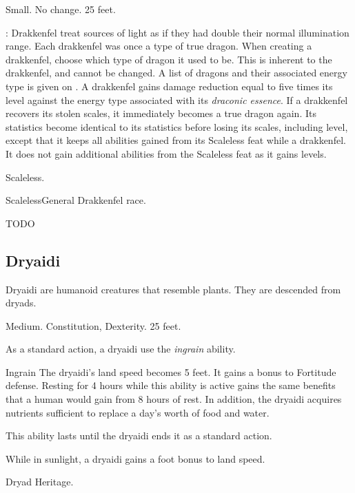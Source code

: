          Small.
         No change.
         25 feet.
        \begin{itemize}
            : Drakkenfel treat sources of light as if they had double their normal illumination range.
             Each drakkenfel was once a type of true dragon.
                When creating a drakkenfel, choose which type of dragon it used to be.
                This is inherent to the drakkenfel, and cannot be changed.
                A list of dragons and their associated energy type is given on .
             A drakkenfel gains damage reduction equal to five times its level against the energy type associated with its \textit{draconic essence}.
             If a drakkenfel recovers its stolen scales, it immediately becomes a true dragon again.
                Its statistics become identical to its statistics before losing its scales, including level, except that it keeps all abilities gained from its Scaleless feat while a drakkenfel.
                It does not gain additional abilities from the Scaleless feat as it gains levels.
        \end{itemize}
         Scaleless.

        \begin{feat}{Scaleless}{General}
            \featpre Drakkenfel race.

            TODO
            
        \end{feat}

    \subsection{Dryaidi}

        Dryaidi are humanoid creatures that resemble plants. They are descended from dryads.

         Medium.
          Constitution,  Dexterity.
         25 feet.
        \begin{itemize}
             As a standard action, a dryaidi use the \textit{ingrain} ability.
                \begin{ability}{Ingrain}
                    The dryaidi's land speed becomes 5 feet.
                    It gains a  bonus to Fortitude defense.
                    Resting for 4 hours while this ability is active gains the same benefits that a human would gain from 8 hours of rest.
                    In addition, the dryaidi acquires nutrients sufficient to replace a day's worth of food and water.

                    This ability lasts until the dryaidi ends it as a standard action.
                \end{ability}
             While in sunlight, a dryaidi gains a  foot bonus to land speed.
        \end{itemize}
         Dryad Heritage.

